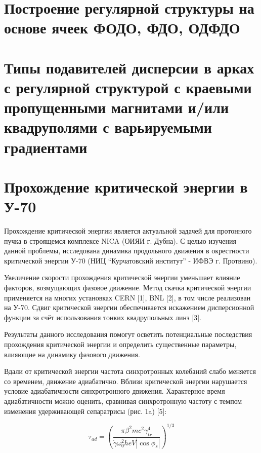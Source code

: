 	\section{Построение регулярной структуры на основе ячеек ФОДО, ФДО, ОДФДО}\label{sec:transition_jump/FODO_FDO}

	\section{Типы подавителей дисперсии в арках с регулярной структурой с краевыми пропущенными магнитами и/или квадруполями с варьируемыми градиентами}\label{sec:transition_jump/suppression}

\section{Прохождение критической энергии в У-70}\label{sec:transition_jump/U-70}
\par Прохождение критической энергии является актуальной задачей для протонного пучка в строящемся комплексе NICA (ОИЯИ г. Дубна). С целью изучения данной проблемы, исследована динамика продольного движения в окрестности критической энергии У-70 (НИЦ “Курчатовский институт” - ИФВЭ г. Протвино).

\par Увеличение скорости прохождения критической энергии уменьшает влияние факторов, возмущающих фазовое движение. Метод скачка критической энергии применяется на многих установках CERN [1], BNL [2], в том числе реализован на У-70. Сдвиг критической энергии обеспечивается искажением дисперсионной функции за счёт использования тонких квадрупольных линз [3].
\par Результаты данного исследования помогут осветить потенциальные последствия прохождения критической энергии и определить существенные параметры, влияющие на динамику фазового движения.

\par Вдали от критической энергии частота синхротронных колебаний слабо меняется со временем, движение адиабатично. Вблизи критической энергии нарушается условие адиабатичности синхротронного движения. Характерное время адиабатичности можно оценить, сравнивая синхротронную частоту с темпом изменения удерживающей сепаратрисы (рис. 1a) [5]:

\begin{equation}
\tau_{ad}=\left(\frac{\pi\beta^2mc^2\gamma_{tr}^4}{\dot{\gamma}\omega_0^2heV\left|\cos{\phi_s}\right|}\right)^{1/3}
\label{eq:adiabaticity}
\end{equation}

